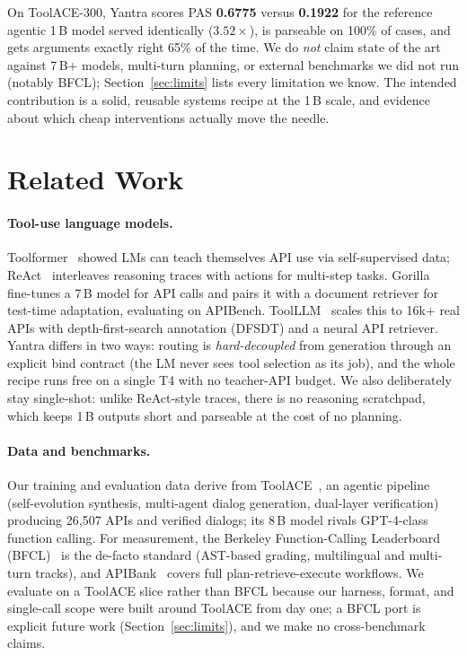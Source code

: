 \documentclass[11pt]{article}
\begin{document}
On ToolACE-300, Yantra scores PAS \textbf{0.6775} versus \textbf{0.1922} for the
reference agentic 1\,B model served identically ($3.52\times$), is parseable on
100\% of cases, and gets arguments exactly right 65\% of the time. We do \emph{not}
claim state of the art against 7\,B$+$ models, multi-turn planning, or external
benchmarks we did not run (notably BFCL); Section~\ref{sec:limits} lists every
limitation we know. The intended contribution is a solid, reusable systems
recipe at the 1\,B scale, and evidence about which cheap interventions actually
move the needle.

\section{Related Work}
\label{sec:related}

\paragraph{Tool-use language models.}
Toolformer~\cite{toolformer} showed LMs can teach themselves API use via
self-supervised data; ReAct~\cite{react} interleaves reasoning traces with
actions for multi-step tasks. Gorilla~\cite{gorilla} fine-tunes a 7\,B model for
API calls and pairs it with a document retriever for test-time adaptation,
evaluating on APIBench. ToolLLM~\cite{toolllm} scales this to 16k$+$ real APIs
with depth-first-search annotation (DFSDT) and a neural API retriever. Yantra
differs in two ways: routing is \emph{hard-decoupled} from generation through an
explicit bind contract (the LM never sees tool selection as its job), and the
whole recipe runs free on a single T4 with no teacher-API budget. We also
deliberately stay single-shot: unlike ReAct-style traces, there is no reasoning
scratchpad, which keeps 1\,B outputs short and parseable at the cost of no
planning.

\paragraph{Data and benchmarks.}
Our training and evaluation data derive from ToolACE~\cite{toolace}, an agentic
pipeline (self-evolution synthesis, multi-agent dialog generation, dual-layer
verification) producing 26,507 APIs and verified dialogs; its 8\,B model rivals
GPT-4-class function calling. For measurement, the Berkeley Function-Calling
Leaderboard (BFCL)~\cite{bfcl} is the de-facto standard (AST-based grading,
multilingual and multi-turn tracks), and APIBank~\cite{apibank} covers full
plan-retrieve-execute workflows. We evaluate on a ToolACE slice rather than BFCL
because our harness, format, and single-call scope were built around ToolACE
from day one; a BFCL port is explicit future work (Section~\ref{sec:limits}), and
we make no cross-benchmark claims.
\end{document}
